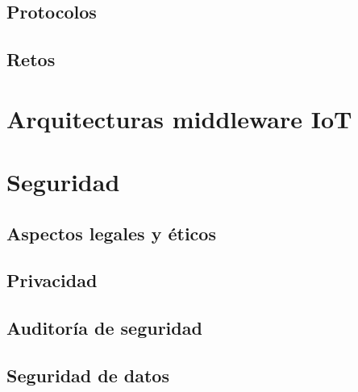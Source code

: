 {\cite{8320780}

\subsection{Protocolos}

\cite{8913969}


\subsection{Retos}

\section{Arquitecturas middleware IoT}

\section{Seguridad}

\subsection{Aspectos legales y éticos}


\subsection{Privacidad}


\subsection{Auditoría de seguridad}


\subsection{Seguridad de datos}

}